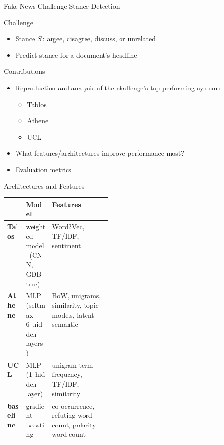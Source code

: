 \documentclass[english,handout]{mlutalk}
\newcommand{\TFIDF}{\mbox{TF/IDF}\xspace}
\begin{document}
\begin{frame}[allowframebreaks]{Fake News Challenge Stance Detection~\cite{HanselowskiSSCC2018}}

  \begin{block}{Challenge}
    \begin{itemize}
      \item Stance $S$\,: argee, disagree, discuss, or unrelated
      \item Predict stance for a document's headline
    \end{itemize}
  \end{block}

  \begin{block}{Contributions}
    \begin{itemize}
      \item Reproduction and analysis of the challenge's top-performing systems
      \begin{itemize}
        \item Tablos
        \item Athene
        \item UCL
      \end{itemize}
      \item What features/architectures improve performance most?
      \item Evaluation metrics
    \end{itemize}
  \end{block}
  
  \framebreak

  \begin{block}{Architectures and Features}
    \footnotesize\centering\vspace*{1.5ex}
    \begin{tabularx}{\linewidth}{lp{0.25\linewidth}X}
      \toprule
      & \textbf{Model} & \textbf{Features} \\
      \midrule
      \textbf{Talos} & weighted model~(CNN, GDB~tree) & Word2Vec, \TFIDF, sentiment \\
      \textbf{Athene} & MLP (softmax, 6~hidden layers) & BoW, unigrams, similarity, topic models, latent semantic \\
      \textbf{UCL} & MLP (1~hidden layer) & unigram term frequency, \TFIDF, similarity \\
      \textbf{baseline} & gradient boosting & co-occurrence, refuting word count, polarity word count \\
      \bottomrule
    \end{tabularx}
  \end{block}


\end{frame}
\end{document}

